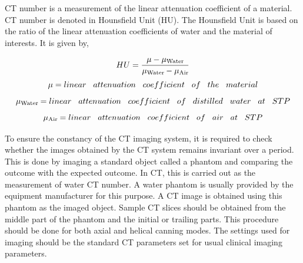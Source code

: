 \documentclass[12pt]{article}
\begin{document}
CT number is a measurement of the linear attenuation coefficient of a material. CT number is denoted in Hounsfield Unit (HU). The Hounsfield Unit is based on the ratio of the linear attenuation coefficients of water and the material of interests. It is given by,

\begin{equation*}
    HU = \frac{\mu - \mu\mysubscript{Water}}{\mu\mysubscript{Water}-\mu\mysubscript{Air}}
\end{equation*}
\begin{equation*}
    \mu = linear\hspace{0.3 cm} attenuation\hspace{0.3 cm} coefficient\hspace{0.3 cm} of \hspace{0.3 cm}the \hspace{0.3 cm}material
\end{equation*}
\begin{equation*}
    \mu\mysubscript{Water} = linear\hspace{0.3 cm} attenuation\hspace{0.3 cm} coefficient\hspace{0.3 cm} of\hspace{0.3 cm} distilled \hspace{0.3 cm}water\hspace{0.3 cm} at\hspace{0.3 cm} STP   
\end{equation*}
\begin{equation*}
    \mu\mysubscript{Air} = linear \hspace{0.3 cm}attenuation \hspace{0.3 cm}coefficient\hspace{0.3 cm} of \hspace{0.3 cm}air \hspace{0.3 cm}at\hspace{0.3 cm} STP
\end{equation*}

To ensure the constancy of the CT imaging system, it is required to check whether the images obtained by the CT system remains invariant over a period. This is done by imaging a standard object called a phantom and comparing the outcome with the expected outcome. In CT, this is carried out as the measurement of water CT number. A water phantom is usually provided by the equipment manufacturer for this purpose. A CT image is obtained using this phantom as the imaged object. Sample CT slices should be obtained from the middle part of the phantom and the initial or trailing parts. This procedure should be done for both axial and helical canning modes. The settings used for imaging should be the standard CT parameters set for usual clinical imaging parameters.
\end{document}
